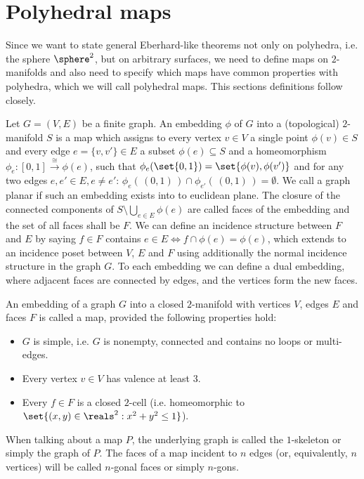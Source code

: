 \section{Polyhedral maps}\label{sec:polymap}

Since we want to state general {\sc Eberhard}-like theorems not only on polyhedra, i.e. the sphere $\sphere^2$, but on arbitrary surfaces, we need to define maps on $2$-manifolds and also need to specify which maps have common properties with polyhedra, which we will call polyhedral maps. This sections definitions follow \cite{brehm2004polyhedralmaps} closely.

\begin{definition}
  Let $G = (V, E)$ be a finite graph. An embedding $\phi$ of $G$ into a (topological) $2$-manifold $S$ is a map which assigns to every vertex $v \in V$ a single point $\phi(v) \in S$ and every edge $e = \{v, v'\} \in E$ a subset $\phi(e) \subseteq S$ and a homeomorphism $\phi_e : [0, 1] \stackrel{\cong}{\longrightarrow} \phi(e)$, such that $\phi_e(\set{0, 1}) = \set{\phi(v), \phi(v')}$ and for any two edges $e, e' \in E, e \neq e'$: $\phi_e(\,(0,1)\,) \cap \phi_{e'}(\,(0,1)\,) = \emptyset$. We call a graph planar if such an embedding exists into to euclidean plane. The closure of the connected components of $S \setminus \bigcup_{e \in E} \phi(e)$ are called faces of the embedding and the set of all faces shall be $F$. We can define an incidence structure between $F$ and $E$ by saying $f \in F$ contains $e \in E \iff f \cap \phi(e) = \phi(e)$, which extends to an incidence poset between $V$, $E$ and $F$ using additionally the normal incidence structure in the graph $G$. To each embedding we can define a dual embedding, where adjacent faces are connected by edges, and the vertices form the new faces.
\end{definition}

\begin{definition} \label{def:map} An embedding of a graph $G$ into a closed $2$-manifold with vertices $V$, edges $E$ and faces $F$ is called a map, provided the following properties hold:
  \begin{itemize}
  \item $G$ is simple, i.e. $G$ is nonempty, connected and contains no loops or multi-edges.
  \item Every vertex $v \in V$ has valence at least $3$.
  \item Every $f \in F$ is a closed $2$-cell (i.e. homeomorphic to $\set{(x, y) \in \reals^2 : x^2 + y^2 \leq 1}$).
  \end{itemize}
  When talking about a map $P$, the underlying graph is called the $1$-skeleton or simply the graph of $P$. The faces of a map incident to $n$ edges (or, equivalently, $n$ vertices) will be called $n$-gonal faces or simply $n$-gons.
\end{definition}

